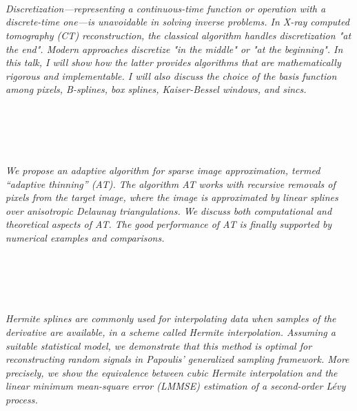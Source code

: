 \begin{multicols}{2}
        \\\\
\\
      \textit{Discretization—representing a continuous-time function or operation with a discrete-time one—is unavoidable in solving inverse problems. In X-ray computed tomography (CT) reconstruction, the classical algorithm handles discretization "at the end". Modern approaches discretize "in the middle" or "at the beginning". In this talk, I will show how the latter provides algorithms that are mathematically rigorous and implementable. I will also discuss the choice of the basis function among pixels, B-splines, box splines, Kaiser-Bessel windows, and sincs.}\\
\\ 
        \\
        \\\\
\\
      \textit{We propose an adaptive algorithm for sparse image approximation, termed “adaptive thinning” (AT). The algorithm AT works with recursive removals of pixels from the target image, where the image is approximated by linear splines over anisotropic Delaunay triangulations. We discuss both computational and theoretical aspects of AT. The good performance of AT is finally supported 
by numerical examples and comparisons.}\\
\\ 
        \\
        \\\\
\\
      \textit{Hermite splines are commonly used for interpolating data when samples of the derivative are available, in a scheme
called Hermite interpolation. Assuming a suitable statistical model, we demonstrate that this method is optimal for
reconstructing random signals in Papoulis’ generalized sampling framework. More precisely, we show the equivalence between cubic Hermite interpolation and the linear minimum mean-square error (LMMSE) estimation of a second-order Lévy process. }\\
\\ 
        \\
        \\\\

\end{multicols}
